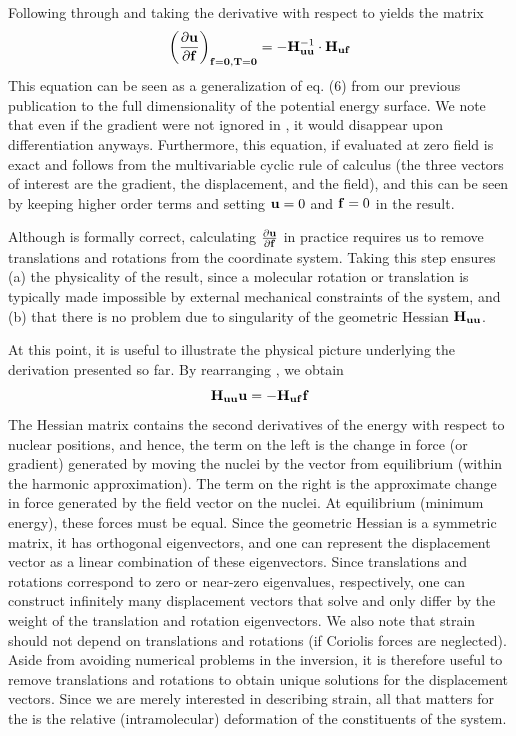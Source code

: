 Following through and taking the derivative with respect to \ff{} yields the matrix \firstDeriv{\uu}{\ff} 
\begin{equation}
  \label{eq:dxvec}
  \left( {\frac{\partial {\ensuremath{\bf{u}}}}{\partial {\ensuremath{\bf{f}}}}} \right)_{{\mathbf f} = {\mathbf 0}, {\mathbf T} = {\mathbf 0}} 
  = -{\mathbf H}_{{\bf{u}} {\bf{u}}}^{-1} \cdot {\mathbf H}_{{\bf{u}} {\bf{f}}}
\end{equation}
This equation can be seen as a generalization of eq. (6) from our previous publication \cite{Werling0} to the full dimensionality of the
potential energy surface.  
We note that even if the gradient were not ignored in 
, it would disappear upon differentiation anyways. 
Furthermore, this equation, if evaluated at zero field is exact and
follows from the multivariable cyclic rule of calculus (the three vectors of interest are the gradient, the displacement, and the field), and 
this can be seen by keeping higher order terms and setting ${\bf{u}}=0$ and ${\bf{f}}=0$ in the result.

Although  is formally correct, calculating ${\frac{\partial {\ensuremath{\bf{u}}}}{\partial {\ensuremath{\bf{f}}}}}$ in practice requires us to remove
translations and rotations from the coordinate system. 
Taking this step ensures (a) the physicality of the result, since
a molecular rotation or translation is typically made impossible by external mechanical constraints of the system, and
(b) that there is no problem due to singularity of the geometric Hessian ${\mathbf H}_{{\bf{u}}{}{\bf{u}}{}}$. 

At this point, it is useful to illustrate the physical picture underlying the derivation presented
so far. 
By rearranging , we obtain 
\begin{equation}
  \label{eq:forces}
  {\mathbf H}_{{\bf{u}} {\bf{u}}} {\bf{u}} = -{\mathbf H}_{{\bf{u}} {\bf{f}}} {\bf{f}}
\end{equation}
The Hessian matrix contains the second derivatives of the energy with respect to nuclear positions, and hence, the term
on the left is the change in force (or gradient) generated by moving the
nuclei by the vector \uu from equilibrium (within the harmonic approximation).  
The term on the right is the approximate change in force generated by the field vector \ff on the nuclei.
At equilibrium (minimum energy), these forces must be equal. 
Since the geometric Hessian is a symmetric matrix, it has orthogonal eigenvectors, and 
one can represent the displacement vector \uu{} as a linear combination of these eigenvectors. 
Since translations and rotations correspond to zero or near-zero eigenvalues, respectively, one can construct infinitely
many displacement vectors that solve  and only differ by the weight of the translation and rotation
eigenvectors. 
We also note that strain should not depend on translations and rotations (if Coriolis forces are
neglected). 
Aside from avoiding numerical problems in the inversion, it is therefore useful to remove translations and
rotations to obtain unique solutions for the displacement vectors. 
Since we are merely interested in describing strain, all that matters for the is the relative (intramolecular) deformation of the constituents of the system.


